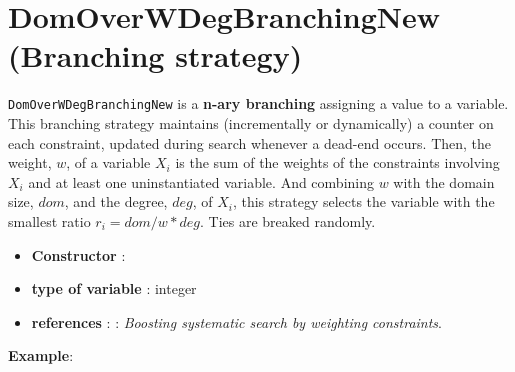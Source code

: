 \section{DomOverWDegBranchingNew (Branching strategy)}\label{domoverwdeg:domoverwdegbranchstrat}\hypertarget{domoverwdeg:domoverwdegbranchstrat}{}
\begin{notedef}
  \texttt{DomOverWDegBranchingNew} is a \textbf{n-ary branching} assigning a value to a variable. This branching strategy maintains (incrementally or dynamically) a counter on each constraint, updated during search whenever a dead-end occurs. Then, the weight, $w$, of a variable $X_i$ is the sum of the weights of the constraints involving $X_i$ and at least one uninstantiated variable. And combining $w$ with the domain size, $dom$, and the degree, $deg$, of $X_i$, this strategy selects the variable with the smallest ratio $r_i=dom/w*deg$. Ties are breaked randomly.
\end{notedef}

\begin{itemize}
	\item \textbf{Constructor} :
	\item \textbf{type of variable} : integer
	\item \textbf{references} : \cite{Boussemart04}: \emph{Boosting systematic search by weighting constraints}.
\end{itemize}

\textbf{Example}:
%

